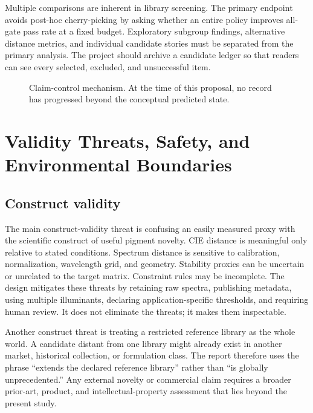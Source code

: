 \documentclass[conference]{IEEEtran}
\begin{document}
Multiple comparisons are inherent in library screening. The primary endpoint avoids post-hoc cherry-picking by asking whether an entire policy improves all-gate pass rate at a fixed budget. Exploratory subgroup findings, alternative distance metrics, and individual candidate stories must be separated from the primary analysis. The project should archive a candidate ledger so that readers can see every selected, excluded, and unsuccessful item.

\begin{figure}[!t]
\centering
{}
\caption{Claim-control mechanism. At the time of this proposal, no record has progressed beyond the conceptual predicted state.}
\label{fig:states}
\end{figure}

\section{Validity Threats, Safety, and Environmental Boundaries}

\subsection{Construct validity}

The main construct-validity threat is confusing an easily measured proxy with the scientific construct of useful pigment novelty. CIE distance is meaningful only relative to stated conditions. Spectrum distance is sensitive to calibration, normalization, wavelength grid, and geometry. Stability proxies can be uncertain or unrelated to the target matrix. Constraint rules may be incomplete. The design mitigates these threats by retaining raw spectra, publishing metadata, using multiple illuminants, declaring application-specific thresholds, and requiring human review. It does not eliminate the threats; it makes them inspectable.

Another construct threat is treating a restricted reference library as the whole world. A candidate distant from one library might already exist in another market, historical collection, or formulation class. The report therefore uses the phrase ``extends the declared reference library'' rather than ``is globally unprecedented.'' Any external novelty or commercial claim requires a broader prior-art, product, and intellectual-property assessment that lies beyond the present study.
\end{document}
